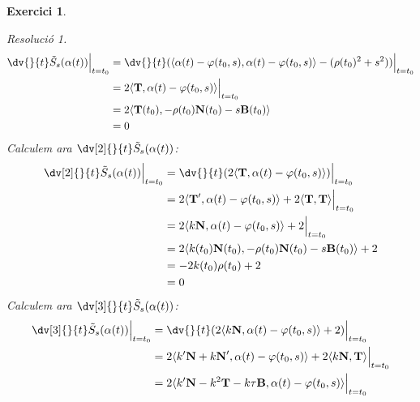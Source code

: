 \documentclass[10pt,a4paper]{article}
\newcommand{\vf}[1]{\boldsymbol{\mathrm{#1}}} %
\newtheorem{exercice}{Exercici}
\theoremstyle{remark}
\newtheorem*{resolution}{Resolució}
\theoremstyle{math}
\begin{document}
\begin{exercice}
\begin{enumerate}
\begin{resolution}
\begin{align*}
              \dv{}{t}\tilde{S}_s(\alpha(t))\Big|_{t=t_0} & =\dv{}{t}(\langle\alpha(t)-\varphi(t_0,s),\alpha(t)-\varphi(t_0,s)\rangle-(\rho(t_0)^2+s^2))\Big|_{t=t_0} \\
                                                          & =2\langle\vf{T},\alpha(t)-\varphi(t_0,s)\rangle \Big|_{t=t_0}                                             \\
                                                          & =2\langle\vf{T}(t_0),-\rho(t_0)\vf{N}(t_0) - s\vf{B}(t_0)\rangle                                          \\
                                                          & =0
            \end{align*}
            Calculem ara $\dv[2]{}{t}\tilde{S}_s(\alpha(t))$:
            \begin{align*}
              \dv[2]{}{t}\tilde{S}_s(\alpha(t))\Big|_{t=t_0} & =\dv{}{t}(2\langle\vf{T},\alpha(t)-\varphi(t_0,s)\rangle)\Big|_{t=t_0}                      \\
                                                             & =2\langle\vf{T}',\alpha(t)-\varphi(t_0,s)\rangle+2\langle\vf{T},\vf{T}\rangle \Big|_{t=t_0} \\
                                                             & =2\langle k\vf{N},\alpha(t)-\varphi(t_0,s)\rangle+2 \Big|_{t=t_0}                           \\
                                                             & =2\langle k(t_0)\vf{N}(t_0),-\rho(t_0)\vf{N}(t_0) - s\vf{B}(t_0)\rangle+2                   \\
                                                             & =-2k(t_0)\rho(t_0)+2                                                                        \\
                                                             & =0
            \end{align*}
            Calculem ara $\dv[3]{}{t}\tilde{S}_s(\alpha(t))$:
            \begin{align*}
              \dv[3]{}{t}\tilde{S}_s(\alpha(t))\Big|_{t=t_0} & =\dv{}{t}(2\langle k\vf{N},\alpha(t)-\varphi(t_0,s)\rangle+2)\Big|_{t=t_0}                                                \\
                                                             & =2\langle k'\vf{N}+k\vf{N}',\alpha(t)-\varphi(t_0,s)\rangle+2\langle k\vf{N},\vf{T}\rangle \Big|_{t=t_0}                  \\
                                                             & =2\langle k'\vf{N}-k^2\vf{T}-k\tau\vf{B},\alpha(t)-\varphi(t_0,s)\rangle \Big|_{t=t_0}                                    \\

\end{align*}
\end{resolution}
\end{enumerate}
\end{exercice}
\end{document}
